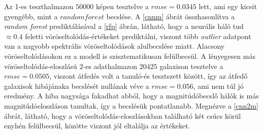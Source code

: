 \documentclass[12pt,letterpaper,oneside,openright]{book}
\begin{document}
\newline\indent
 Az 1-es teszthalmazon $\num{50000}$ képen tesztelve a $\textit{rmse} = 0.0345$ lett, ami egy kicsit gyengébb, mint a $random forest$ becslése. A \ref{cnnm} ábrát összhasonlítva a \textit{random forest} prediktálásával a \ref{rfp} ábrán, látható, hogy a neurális háló tud  $\approx 0.4$ feletti vöröseltolódás-értékeket prediktálni, viszont több \textit{outlier} adatpont van a nagyobb spektrális vöröseltolódások alulbecslése miatt. Alacsony vöröseltolódásokon ez a modell is szisztematikusan felülbecsül. A lényegesen más vöröseltolódás-eloszlású 2-es adathalmazon $\num{20425}$ galaxison tesztelve a $\textit{rmse} = 0.0505$, viszont átfedés volt a tanuló-és tesztszett között, így az átfedő galaxisok hibájánaka becslését nullának véve a $rmse =  0.056$, ami nem túl jó eredmény. A hiba nagysága fakadhat abból, hogy a magnitúdóbecslő hálók is más magnitúdóeloszláson tanultak, így a becslésük pontatlanabb. Megnézve a \ref{cnn2m} ábrát, látható, hogy a vöröseltolódás-eloszlásokban található két csúcs körül enyhén felülbecsül, közötte viszont jól eltalálja az értékeket.
\end{document}
